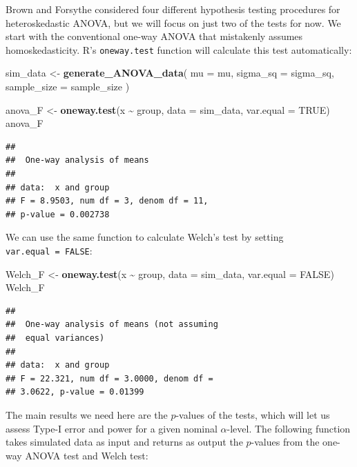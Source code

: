 \documentclass[
]{book}
\newenvironment{Shaded}{\begin{snugshade}}{\end{snugshade}}
\newcommand{\AttributeTok}[1]{\textcolor[rgb]{0.13,0.29,0.53}{#1}}
\newcommand{\ConstantTok}[1]{\textcolor[rgb]{0.56,0.35,0.01}{#1}}
\newcommand{\FunctionTok}[1]{\textcolor[rgb]{0.13,0.29,0.53}{\textbf{#1}}}
\newcommand{\NormalTok}[1]{#1}
\newcommand{\OtherTok}[1]{\textcolor[rgb]{0.56,0.35,0.01}{#1}}
\newcommand{\SpecialCharTok}[1]{\textcolor[rgb]{0.81,0.36,0.00}{\textbf{#1}}}
\begin{document}
Brown and Forsythe considered four different hypothesis testing procedures for heteroskedastic ANOVA, but we will focus on just two of the tests for now.
We start with the conventional one-way ANOVA that mistakenly assumes homoskedasticity.
R's \texttt{oneway.test} function will calculate this test automatically:

\begin{Shaded}
\begin{Highlighting}[]
\NormalTok{sim\_data }\OtherTok{\textless{}{-}} \FunctionTok{generate\_ANOVA\_data}\NormalTok{(}
  \AttributeTok{mu =}\NormalTok{ mu, }
  \AttributeTok{sigma\_sq =}\NormalTok{ sigma\_sq,}
  \AttributeTok{sample\_size =}\NormalTok{ sample\_size}
\NormalTok{)}

\NormalTok{anova\_F }\OtherTok{\textless{}{-}} \FunctionTok{oneway.test}\NormalTok{(x }\SpecialCharTok{\textasciitilde{}}\NormalTok{ group, }\AttributeTok{data =}\NormalTok{ sim\_data, }\AttributeTok{var.equal =} \ConstantTok{TRUE}\NormalTok{)}
\NormalTok{anova\_F}
\end{Highlighting}
\end{Shaded}

\begin{verbatim}
## 
##  One-way analysis of means
## 
## data:  x and group
## F = 8.9503, num df = 3, denom df = 11,
## p-value = 0.002738
\end{verbatim}

We can use the same function to calculate Welch's test by setting \texttt{var.equal\ =\ FALSE}:

\begin{Shaded}
\begin{Highlighting}[]
\NormalTok{Welch\_F }\OtherTok{\textless{}{-}} \FunctionTok{oneway.test}\NormalTok{(x }\SpecialCharTok{\textasciitilde{}}\NormalTok{ group, }\AttributeTok{data =}\NormalTok{ sim\_data, }\AttributeTok{var.equal =} \ConstantTok{FALSE}\NormalTok{)}
\NormalTok{Welch\_F}
\end{Highlighting}
\end{Shaded}

\begin{verbatim}
## 
##  One-way analysis of means (not assuming
##  equal variances)
## 
## data:  x and group
## F = 22.321, num df = 3.0000, denom df =
## 3.0622, p-value = 0.01399
\end{verbatim}

The main results we need here are the \(p\)-values of the tests, which will let us assess Type-I error and power for a given nominal \(\alpha\)-level. The following function takes simulated data as input and returns as output the \(p\)-values from the one-way ANOVA test and Welch test:
\end{document}
